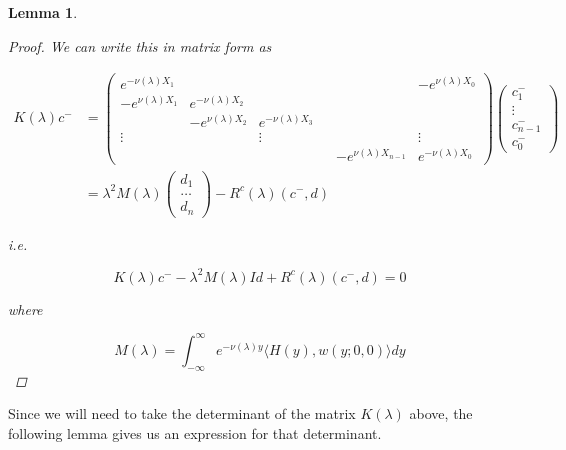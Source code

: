 \documentclass[12pt]{article}
\newtheorem{lemma}{Lemma}
\begin{document}
\begin{lemma}
\begin{proof}
We can write this in matrix form as

\begin{align*}
K(\lambda) c^- &= 
\begin{pmatrix}
e^{-\nu(\lambda)X_1} & & & & & -e^{\nu(\lambda)X_0} \\
-e^{\nu(\lambda)X_1} & e^{-\nu(\lambda)X_2} \\
& -e^{\nu(\lambda)X_2} & e^{-\nu(\lambda)X_3} \\
\vdots & & \vdots & &&  \vdots \\
& & & & -e^{\nu(\lambda)X_{n-1}} & e^{-\nu(\lambda)X_0} 
\end{pmatrix}
\begin{pmatrix}
c_1^- \\ \vdots \\ c_{n-1}^- \\ c_0^-
\end{pmatrix} \\
&= \lambda^2 M(\lambda) \begin{pmatrix}
d_1 \\ \dots \\ d_n
\end{pmatrix} - R^c(\lambda)(c^-,d)
\end{align*}

i.e.

\begin{equation}
K(\lambda)c^- -\lambda^2 M(\lambda) I d + R^c(\lambda)(c^-,d) = 0
\end{equation}

where

\[
M(\lambda) = \int_{-\infty}^\infty e^{-\nu(\lambda)y} \langle H(y), w(y; 0, 0) \rangle dy
\]

\end{proof}
\end{lemma}

Since we will need to take the determinant of the matrix $K(\lambda)$ above, the following lemma gives us an expression for that determinant.
\end{document}
